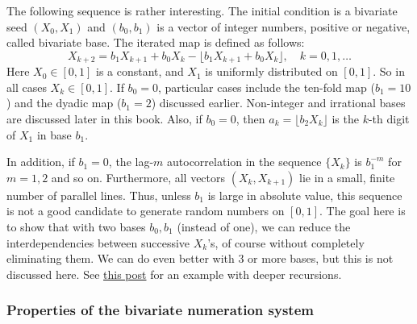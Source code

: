\documentclass[oneside,10pt]{book}
\begin{document}
The following sequence is rather interesting. The initial condition is a \textcolor{index}{bivariate seed} $(X_0, X_1)$ and $(b_0,b_1)$ is a vector of integer numbers, positive or negative, called \textcolor{index}{bivariate base}. The iterated map is defined as follows:
$$
X_{k+2} = b_1 X_{k+1} + b_0 X_k - \lfloor b_1 X_{k+1} + b_0 X_k \rfloor, \quad k=0,1,\dots
$$
Here $X_0\in [0, 1]$ is a constant, and $X_1$ is uniformly distributed on $[0, 1]$. So in all cases $X_k\in [0, 1]$. If $b_0=0$, particular cases include the ten-fold map ($b_1=10$) and the dyadic map ($b_1=2$) discussed earlier. Non-integer and \textcolor{index}{irrational bases} are discussed later in this book.  Also, if $b_0=0$, then $a_k = \lfloor b_2 X_k\rfloor$ is the $k$-th digit of $X_1$ in base $b_1$.

In addition, if $b_1=0$, the lag-$m$ autocorrelation
 in the sequence $\{X_k\}$ is $b_1^{-m}$ for $m=1,2$ and so on. Furthermore,
 all vectors $(X_k,X_{k+1})$ lie in a small, finite number of parallel lines. Thus, unless $b_1$ is large in absolute value, this sequence is not a good candidate to generate random numbers on $[0,1]$. The goal here is to show that with two bases $b_0,b_1$ (instead of one), we can reduce the
 interdependencies between successive $X_k$'s, of course without completely eliminating them. We can do even better with 3 or more bases, but this is not discussed here.  See \href{https://math.stackexchange.com/questions/4308185/period-or-lack-of-for-a-probably-new-pseudo-random-number-generator}{this post} for an example with deeper recursions.

\subsubsection{Properties of the bivariate numeration system}\label{ssda}
\end{document}
